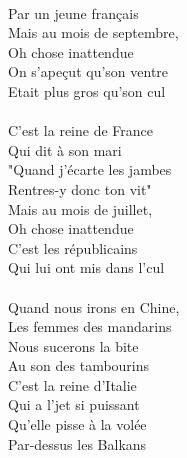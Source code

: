 {\\Par un jeune français
\\Mais au mois de septembre, 
\\Oh chose inattendue
\\On s'apeçut qu'son ventre 
\\Etait plus gros qu'son cul
\\\\C'est la reine de France 
\\Qui dit à son mari
\\"Quand j'écarte les jambes 
\\Rentres-y donc ton vit"
\\Mais au mois de juillet, 
\\Oh chose inattendue
\\C'est les républicains 
\\Qui lui ont mis dans l'cul
\\\\Quand nous irons en Chine, 
\\Les femmes des mandarins
\\Nous sucerons la bite 
\\Au son des tambourins
\\C'est la reine d'Italie 
\\Qui a l'jet si puissant
\\Qu'elle pisse à la volée 
\\Par-dessus les Balkans
\\
}
\breakpage